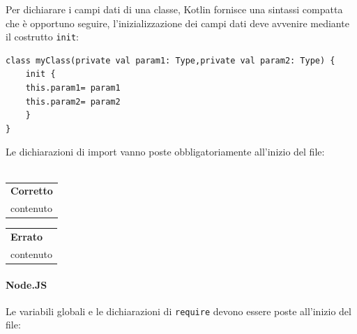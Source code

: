 Per dichiarare i campi dati di una classe, Kotlin fornisce una sintassi compatta che è opportuno seguire, l'inizializzazione dei campi dati deve avvenire mediante il costrutto \texttt{init}:

\begin{lstlisting}
class myClass(private val param1: Type,private val param2: Type) {	
	init {
	this.param1= param1
	this.param2= param2	
	} 
}
\end{lstlisting}

Le dichiarazioni di import vanno poste obbligatoriamente all'inizio del file:\\\\
\begin{minipage}{0.45\textwidth}
	\begin{tabular}{p{\textwidth}}	
		\textbf{Corretto}
		\begin{lstlisting}
		import java.util.*
		
		class example() {
		\\contenuto
		}
		\end{lstlisting}
	\end{tabular}
\end{minipage}
\hfill
\begin{minipage}{0.45\textwidth}
	\begin{tabular}{|p{\textwidth}}		
		\textbf{Errato}
		\begin{lstlisting}
		class example {
		\\contenuto
		}
		
		import java.util.*
		\end{lstlisting}
	\end{tabular}
	
\end{minipage}

\paragraph{Node.JS}
Le variabili globali e le dichiarazioni di \texttt{require} devono essere poste all'inizio del file:\\

